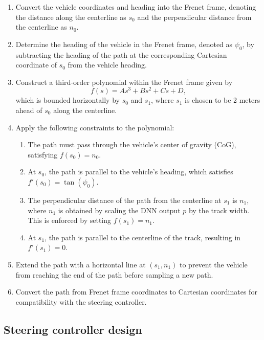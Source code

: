 \begin{enumerate}
    \item Convert the vehicle coordinates and heading into the Frenet frame, denoting the distance along the centerline as $s_0$ and the perpendicular distance from the centerline as $n_0$.
    \item Determine the heading of the vehicle in the Frenet frame, denoted as $\psi_0$, by subtracting the heading of the path at the corresponding Cartesian coordinate of $s_0$ from the vehicle heading.
    \item Construct a third-order polynomial within the Frenet frame given by
        \begin{equation}
        f(s) = As^3 + Bs^2 + Cs + D,
        \end{equation}
    which is bounded horizontally by $s_0$ and $s_1$, where $s_1$ is chosen to be 2 meters ahead of $s_0$ along the centerline.
    \item Apply the following constraints to the polynomial:
    \begin{enumerate}
        \item The path must pass through the vehicle's center of gravity (CoG), satisfying $f(s_0) = n_0$.
        \item At $s_0$, the path is parallel to the vehicle's heading, which satisfies $f'(s_0) = \tan(\psi_0)$.
        \item The perpendicular distance of the path from the centerline at $s_1$ is $n_1$, where $n_1$ is obtained by scaling the DNN output $p$ by the track width.
        This is enforced by setting $f(s_1) = n_1$.
        \item At $s_1$, the path is parallel to the centerline of the track, resulting in $f'(s_1) = 0$.
    \end{enumerate}
    \item Extend the path with a horizontal line at $(s_1,n_1)$ to prevent the vehicle from reaching the end of the path before sampling a new path.
    \item Convert the path from Frenet frame coordinates to Cartesian coordinates for compatibility with the steering controller.
\end{enumerate}



\subsection{Steering controller design}


